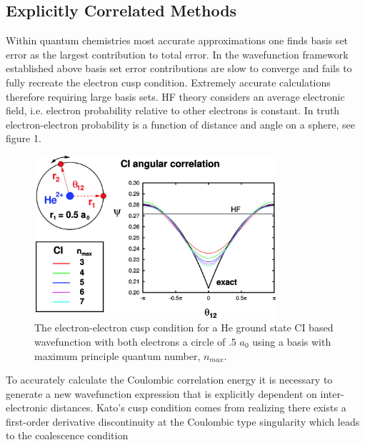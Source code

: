   \subsection{Explicitly Correlated Methods}
    Within quantum chemistries most accurate approximations one finds basis set error as the largest contribution to total error. %
    In the wavefunction framework established above basis set error contributions are slow to converge and fails to fully recreate the electron cusp condition. Extremely accurate calculations therefore requiring large basis sets. %
    HF theory considers an average electronic field, i.e. electron probability relative to other electrons is constant. In truth electron-electron probability is a function of distance and angle on a sphere, see figure 1. %
    \begin{figure}[H]
      \centering
        \includegraphics[width = 9cm, height = 6cm]{./pics/ang.jpeg}
        \caption{The electron-electron cusp condition for a He ground state CI based wavefunction with both electrons a circle of .5 $a_0$ using a basis with maximum principle quantum number, $n_{max}$\cite{Hattig2012}.}
    \end{figure}
    To accurately calculate the Coulombic correlation energy it is necessary to generate a new wavefunction expression that is explicitly dependent on inter-electronic distances. Kato's cusp condition\cite{Kato1957} comes from realizing there exists a first-order derivative discontinuity at the Coulombic type singularity\cite{Hattig2012} which leads to the coalescence condition 

